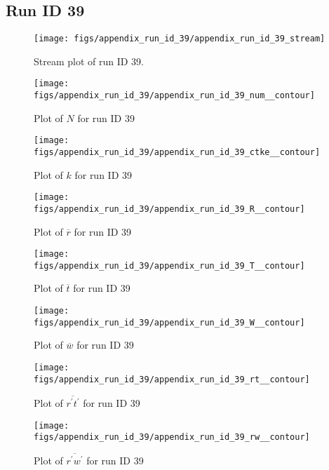 \subsection{Run ID 39}
\begin{figure}[H]
\centering
\texttt{[image: figs/appendix\_run\_id\_39/appendix\_run\_id\_39\_stream]}
\caption{Stream plot of run ID 39.}
\label{fig:appendix_run_id_39_stream}
\end{figure}


\begin{figure}[H]
\centering
\texttt{[image: figs/appendix\_run\_id\_39/appendix\_run\_id\_39\_num\_\_contour]}
\caption{Plot of $N$ for run ID 39}
\label{fig:appendix_run_id_39_num__contour}
\end{figure}


\begin{figure}[H]
\centering
\texttt{[image: figs/appendix\_run\_id\_39/appendix\_run\_id\_39\_ctke\_\_contour]}
\caption{Plot of $k$ for run ID 39}
\label{fig:appendix_run_id_39_ctke__contour}
\end{figure}


\begin{figure}[H]
\centering
\texttt{[image: figs/appendix\_run\_id\_39/appendix\_run\_id\_39\_R\_\_contour]}
\caption{Plot of $\overline{r}$ for run ID 39}
\label{fig:appendix_run_id_39_R__contour}
\end{figure}


\begin{figure}[H]
\centering
\texttt{[image: figs/appendix\_run\_id\_39/appendix\_run\_id\_39\_T\_\_contour]}
\caption{Plot of $\overline{t}$ for run ID 39}
\label{fig:appendix_run_id_39_T__contour}
\end{figure}


\begin{figure}[H]
\centering
\texttt{[image: figs/appendix\_run\_id\_39/appendix\_run\_id\_39\_W\_\_contour]}
\caption{Plot of $\overline{w}$ for run ID 39}
\label{fig:appendix_run_id_39_W__contour}
\end{figure}


\begin{figure}[H]
\centering
\texttt{[image: figs/appendix\_run\_id\_39/appendix\_run\_id\_39\_rt\_\_contour]}
\caption{Plot of $\overline{r^\prime t^\prime}$ for run ID 39}
\label{fig:appendix_run_id_39_rt__contour}
\end{figure}


\begin{figure}[H]
\centering
\texttt{[image: figs/appendix\_run\_id\_39/appendix\_run\_id\_39\_rw\_\_contour]}
\caption{Plot of $\overline{r^\prime w^\prime}$ for run ID 39}
\label{fig:appendix_run_id_39_rw__contour}
\end{figure}


